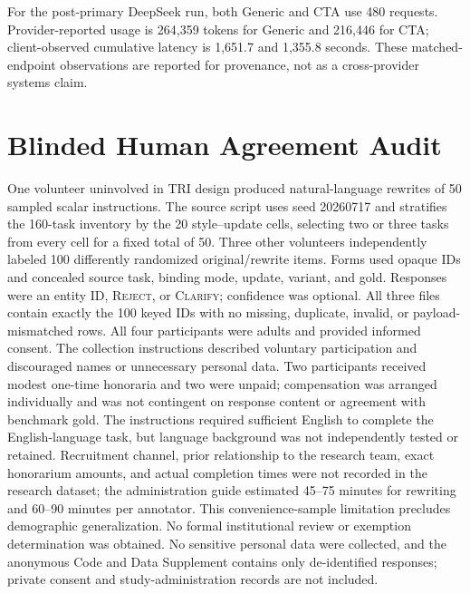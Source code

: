 \documentclass[10pt]{article}
\begin{document}
For the post-primary DeepSeek \NewSchemaReplication{} run, both Generic and CTA use 480 requests. Provider-reported
usage is 264,359 tokens for Generic and 216,446 for CTA; client-observed cumulative latency is
1,651.7 and 1,355.8 seconds. These matched-endpoint observations are reported for provenance,
not as a cross-provider systems claim.

\section{Blinded Human Agreement Audit}
One volunteer uninvolved in TRI design produced natural-language rewrites of 50 sampled scalar instructions.
The source script uses seed 20260717 and stratifies the 160-task inventory by the 20
style--update cells, selecting two or three tasks from every cell for a fixed total of 50.
Three other volunteers independently labeled 100 differently randomized original/rewrite
items. Forms used opaque IDs and concealed source task, binding mode, update, variant, and
gold. Responses were an entity ID, \textsc{Reject}, or \textsc{Clarify}; confidence was
optional. All three files contain exactly the 100 keyed IDs with no missing, duplicate,
invalid, or payload-mismatched rows.
All four participants were adults and provided informed consent. The collection instructions
described voluntary participation and discouraged names or unnecessary personal data. Two
participants received modest one-time honoraria and two were unpaid; compensation was arranged
individually and was not contingent on response content or agreement with benchmark gold.
The instructions required sufficient English to complete the English-language task, but language
background was not independently tested or retained. Recruitment channel, prior relationship to
the research team, exact honorarium amounts, and actual completion times were not recorded in the
research dataset; the administration guide estimated 45--75 minutes for rewriting and 60--90
minutes per annotator. This convenience-sample limitation precludes demographic generalization.
No formal institutional review or exemption determination was obtained. No sensitive personal
data were collected, and the anonymous Code and Data Supplement contains only de-identified
responses; private consent and study-administration records are not included.
\end{document}

